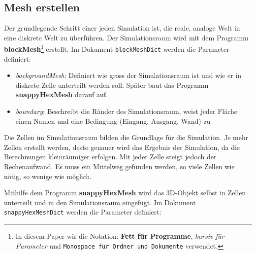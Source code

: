 \subsection{Mesh erstellen \label{openfoam:section:Mesh erstellen}}
Der grundlegende Schritt einer jeden Simulation ist, die reale, analoge Welt in eine diskrete Welt zu überführen.
Der Simulationsraum wird mit dem Programm \textbf{blockMesh}\footnote{In diesem Paper wir die Notation: \textbf{Fett für Programme}, \textit{kursiv für Parameter} und \texttt{Monospace für Ordner und Dokumente} verwendet.} 
erstellt.
Im Dokument \texttt{blockMeshDict} werden die Parameter definiert:

\begin{itemize}
    \item \textit{backgroundMesh}: Definiert wie gross der Simulationsraum ist und wie er in diskrete Zelle unterteilt werden soll. Später baut das Programm \textbf{snappyHexMesh} darauf auf.
    \item \textit{boundary}: Beschreibt die Ränder des Simulationsraum, weist jeder Fläche einen Namen und eine Bedingung (Eingang, Ausgang, Wand) zu
\end{itemize}
Die Zellen im Simulationsraum bilden die Grundlage für die Simulation. 
Je mehr Zellen erstellt werden, desto genauer wird das Ergebnis der Simulation, da die Berechnungen kleinräumiger erfolgen.
Mit jeder Zelle steigt jedoch der Rechenaufwand.
Es muss ein Mittelweg gefunden werden, so viele Zellen wie nötig, so wenige wie möglich.

Mithilfe dem Programm \textbf{snappyHexMesh} wird das 3D-Objekt selbst in  Zellen unterteilt und in den Simulationsraum eingefügt. 
Im Dokument \texttt{snappyHexMeshDict} werden die Parameter definiert:

